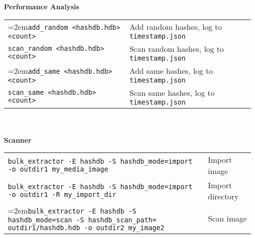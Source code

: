 \begin{footnotesize}
\textbf{Performance Analysis}\\
\begin{tabular}{p{3.6 in} p{4 in}}
\hangindent=2em\texttt{add\_random <hashdb.hdb> <count>} & Add random hashes, log to \texttt{timestamp.json}\\
\texttt{scan\_random <hashdb.hdb> <count>} & Scan random hashes, log to \texttt{timestamp.json}\\
\hangindent=2em\texttt{add\_same <hashdb.hdb> <count>} & Add same hashes, log to \texttt{timestamp.json}\\
\texttt{scan\_same <hashdb.hdb> <count>} & Scan same hashes, log to \texttt{timestamp.json}\\
\end{tabular}
\\
\\
\textbf{\bulk Scanner}\\
\begin{tabular}{p{5.6 in} p{2 in}}
\texttt{bulk\_extractor -E hashdb -S hashdb\_mode=import -o outdir1 my\_media\_image} & Import image\\
\texttt{bulk\_extractor -E hashdb -S hashdb\_mode=import -o outdir1 -R my\_import\_dir} & Import directory\\
\hangindent=2em\texttt{bulk\_extractor -E hashdb -S hashdb\_mode=scan -S hashdb\_scan\_path= outdir1/hashdb.hdb -o outdir2 my\_image2} & Scan image\\
\end{tabular}
\end{footnotesize}


